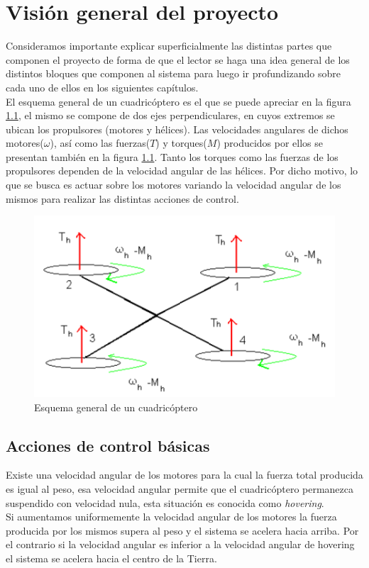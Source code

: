 \documentclass[main]{subfiles}
\begin{document}
\chapter{Visi\'on general del proyecto}
\label{chap:general}
Consideramos importante explicar superficialmente las distintas partes que componen el proyecto de forma de que el lector se haga una idea general de los distintos bloques que componen al sistema para luego ir profundizando sobre cada uno de ellos en los siguientes cap\'itulos.\\

El esquema general de un cuadric\'optero es el que se puede apreciar en la figura \ref{fig:cuad}, el mismo se compone de dos ejes perpendiculares, en cuyos extremos se ubican los propulsores (motores y h\'elices). Las velocidades angulares de dichos motores($\omega$), as\'i como las fuerzas($T$) y torques($M$) producidos por ellos se presentan tambi\'en en la figura \ref{fig:cuad}. Tanto los torques como las fuerzas de los propulsores dependen de la velocidad angular de las h\'elices. Por dicho motivo, lo que se busca es actuar sobre los motores variando la velocidad angular de los mismos para realizar las distintas acciones de control.

\begin{figure}
\centering
\includegraphics[scale=0.5]{./pics_general/quad_hov.pdf}
\caption{Esquema general de un cuadric\'optero}
\label{fig:cuad}
\end{figure}
\section{Acciones de control b\'asicas}
Existe una velocidad angular de los motores para la cual la fuerza total producida es igual al peso, esa velocidad angular permite que el cuadric\'optero permanezca suspendido con velocidad nula, esta situaci\'on es conocida como \emph{hovering}.\\ Si aumentamos uniformemente la velocidad angular de los motores la fuerza producida por los mismos supera al peso y el sistema se acelera hacia arriba. Por el contrario si la velocidad angular es inferior a la velocidad angular de hovering el sistema se acelera hacia el centro de la Tierra.\\
\end{document}
